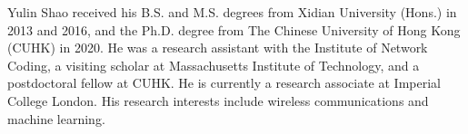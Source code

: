 \documentclass[10pt, journal, letterpaper]{IEEEtran}
\begin{document}
\begin{IEEEbiography}{Yulin Shao}
	received his B.S. and M.S. degrees from Xidian University (Hons.) in 2013 and 2016, and the Ph.D. degree from The Chinese University of Hong Kong (CUHK) in 2020. He was a research assistant with the Institute of Network Coding, a visiting scholar at Massachusetts Institute of Technology, and a postdoctoral fellow at CUHK. He is currently a research associate at Imperial College London. His research interests include wireless communications and machine learning.
\end{IEEEbiography}
\end{document}
